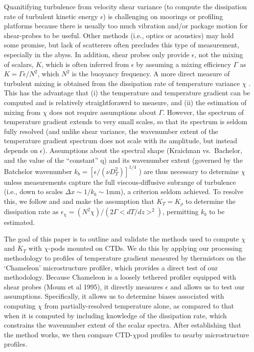 \documentclass{ametsoc}
\begin{document}
Quanitifying turbulence from velocity shear variance (to compute the dissipation rate of turbulent kinetic energy $\epsilon$) is challenging on moorings or profiling platforms because there is usually too much vibration and/or package motion for shear-probes to be useful. Other methods (i.e., optics or acoustics) may hold some promise, but lack of scatterers often precludes this type of measurement, especially in the abyss.  In addition, shear probes only provide $\epsilon$, not the mixing of scalars, $K$, which is often inferred from $\epsilon$ by assuming a mixing efficiency $\Gamma$ \citep{osborn80} as $K=\Gamma \epsilon / N^{2}$, which $N^2$ is the buoyancy frequency.  A more direct measure of turbulent mixing is obtained from the dissipation rate of temperature variance $\chi$ \citep{osborncox72}.  This has the advantage that (i) the temperature and temperature gradient can be computed and is relatively straightforawrd to measure, and (ii) the estimation of mixing from $\chi$ does not require assumptions about $\Gamma$. However, the spectrum of temperature gradient extends to very small scales, so that its spectrum is seldom fully resolved (and unlike shear variance, the wavenumber extent of the temperature gradient spectrum does not scale with its amplitude, but instead depends on $\epsilon$). Assumptions about the spectral shape (Kraichnan vs.\ Bachelor, and the value of the ``constant'' q) and its wavenumber extent (governed by the Batchelor wavenumber $k_b=[\epsilon/(\nu D_{T}^{2})]^{1/4}$  \citep{Batchelor59}) are thus necessary to determine $\chi$ unless measurements capture the full viscous-diffusive subrange of turbulence (i.e., down to scales $\Delta x \sim 1/k_b \sim 1$mm), a criterion seldom achieved.  To resolve this, we follow \cite{alfordpinkel00b} and \cite{moumnash09} and make the assumption that $K_T=K_{\rho}$ to determine the dissipation rate as $\epsilon_{\chi}=(N^2\chi)/(2\Gamma <dT/dz>^2)$, permitting $k_b$ to be estimated. 


The goal of this paper is to outline and validate the methods used to compute $\chi$ and $K_T$ with $\chi$-pods mounted on CTDs.  We do this by applying our processing methodology to profiles of temperature gradient measured by thermistors on the `Chameleon' microstructure profiler, which provides a direct test of our methodology.  Because Chameleon is a loosely tethered profiler equipped with shear probes (Moum et al 1995), it directly measures $\epsilon$ and allows us to test our assumptions.  Specifically, it allows us to determine biases associated with computing $\chi$ from partially-resolved temperature alone, as compared to that when it is computed by including knowledge of the dissipation rate, which constrains the wavenumber extent of the scalar spectra.   After establishing that the method works, we then compare CTD-$\chi$pod profiles to nearby microstructure profiles.
\end{document}
